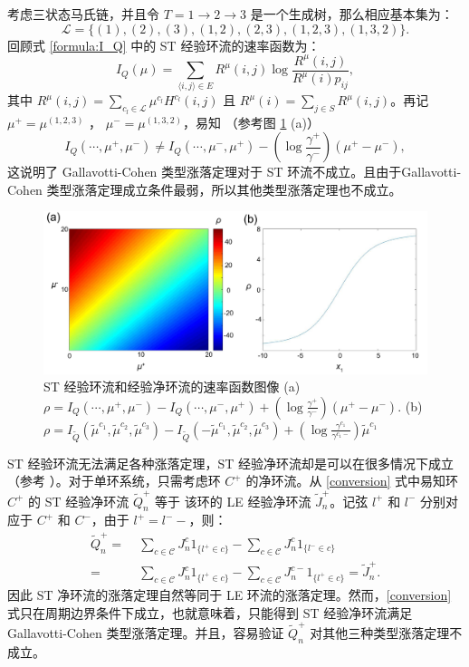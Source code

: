考虑三状态马氏链，并且令 $T = 1\to 2\to 3$ 是一个生成树，那么相应基本集为：
\begin{equation*}
\mathcal{L} = \{(1),(2),(3),(1,2),(2,3),(1,2,3),(1,3,2)\}.
\end{equation*}
回顾式 \eqref{formula:I_Q} 中的 ST 经验环流的速率函数为：
\begin{equation*}
I_Q(\mu) = \sum_{\langle i,j\rangle\in E}R^{\mu}(i,j)\log\frac{R^{\mu}(i,j)}{R^{\mu}(i)p_{ij}},
\end{equation*}
其中 $R^{\mu}(i,j)=\sum_{c_l\in\mathcal{L}}\mu^{c_l}H^{c_l}(i,j)$ 且 $R^{\mu}(i)=\sum_{j\in S}R^{\mu}(i,j)$。再记 $\mu^+ = \mu^{(1,2,3)}$ ， $\mu^- = \mu^{(1,3,2)}$，易知 （参考图 \ref{figure:ratefunction} (a)）
\begin{equation*}
I_Q(\cdots,\mu^+,\mu^-)
\neq I_Q(\cdots,\mu^-,\mu^+)-\left(\log\frac{\gamma^+}{\gamma^-}\right)(\mu^+-\mu^-),
\end{equation*}
这说明了 Gallavotti-Cohen 类型涨落定理对于 ST 环流不成立。且由于Gallavotti-Cohen 类型涨落定理成立条件最弱，所以其他类型涨落定理也不成立。
\begin{figure}[h]
	\centering
	\includegraphics[scale=0.25]{chart/ratefunction.pdf}
	\caption{ST 经验环流和经验净环流的速率函数图像 (a) $\rho=I_Q(\cdots,\mu^+,\mu^-)-I_Q(\cdots,\mu^-,\mu^+)+(\log\frac{\gamma^+}{\gamma^-})(\mu^+-\mu^-)$. (b) $\rho=I_{\tilde{Q}}(\tilde{\mu}^{c_1},\tilde{\mu}^{c_2},\tilde{\mu}^{c_3})- I_{\tilde{Q}}(-\tilde{\mu}^{c_1},\tilde{\mu}^{c_2},\tilde{\mu}^{c_3})
		+(\log\frac{\gamma^{c_1}}{\gamma^{c_1-}})\tilde{\mu}^{c_1}$}\label{figure:ratefunction}
\end{figure}
ST 经验环流无法满足各种涨落定理，ST 经验净环流却是可以在很多情况下成立（参考 \cite{andrieux2007fluctuation,bertini2015flows}）。对于单环系统，只需考虑环 $C^+$ 的净环流。从 \eqref{conversion} 式中易知环 $C^+$ 的 ST 经验净环流  $\tilde{Q}^+_n$ 等于 该环的 LE 经验净环流 $\tilde{J}^+_n$。记弦 $l^+$ 和 $l^-$ 分别对应于 $C^+$ 和 $C^-$，由于 $l^+=l^--$，则：
\begin{equation*}\label{circulation}
    \begin{split}
            \tilde{Q}^{+}_n =&\;\sum_{c\in \mathcal{C}}J^c_n1_{\{l^+\in c \}}-\sum_{c\in \mathcal{C}}J^c_n1_{\{l^-\in c \}}\\
            =&\;\sum_{c\in \mathcal{C}}J^c_n1_{\{l^+\in c \}}-\sum_{c\in \mathcal{C}}J^{c-}_n1_{\{l^+\in c \}} = \tilde{J}^+_n.
    \end{split}
\end{equation*}
因此 ST 净环流的涨落定理自然等同于 LE 环流的涨落定理。然而，\eqref{conversion} 式只在周期边界条件下成立，也就意味着，只能得到 ST 经验净环流满足 Gallavotti-Cohen 类型涨落定理。并且，容易验证 $\tilde{Q}^+_n$ 对其他三种类型涨落定理不成立。

